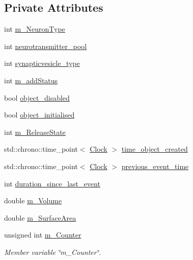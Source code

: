 \subsection*{Private Attributes}
\begin{DoxyCompactItemize}
\item 
int \mbox{\hyperlink{classSynapticVesicle_a2c71a4e09837c1b4ef2111e0eb634030}{m\+\_\+\+Neuron\+Type}}
\item 
int \mbox{\hyperlink{classSynapticVesicle_afa30c67ce14495976bc167cbd8528cdf}{neurotransmitter\+\_\+pool}}
\item 
int \mbox{\hyperlink{classSynapticVesicle_a568770c79ad49a55129076a1bc625db2}{synapticvesicle\+\_\+type}}
\item 
int \mbox{\hyperlink{classSynapticVesicle_a8a06e1643fa04b7f317523382786f200}{m\+\_\+add\+Status}}
\item 
bool \mbox{\hyperlink{classSynapticVesicle_ad50cf0b70327fd52cd6b2894e19e5842}{object\+\_\+disabled}}
\item 
bool \mbox{\hyperlink{classSynapticVesicle_aef65466f1440e00ad7d352095fe019de}{object\+\_\+initialised}}
\item 
int \mbox{\hyperlink{classSynapticVesicle_a73a7ecd250c4750d9b414c543e534a96}{m\+\_\+\+Release\+State}}
\item 
std\+::chrono\+::time\+\_\+point$<$ \mbox{\hyperlink{universe_8h_a0ef8d951d1ca5ab3cfaf7ab4c7a6fd80}{Clock}} $>$ \mbox{\hyperlink{classSynapticVesicle_af025ff605f37a683bd4a00d9140a217b}{time\+\_\+object\+\_\+created}}
\item 
std\+::chrono\+::time\+\_\+point$<$ \mbox{\hyperlink{universe_8h_a0ef8d951d1ca5ab3cfaf7ab4c7a6fd80}{Clock}} $>$ \mbox{\hyperlink{classSynapticVesicle_a9ba999fc5ee77df5a962592ea4935329}{previous\+\_\+event\+\_\+time}}
\item 
int \mbox{\hyperlink{classSynapticVesicle_add9c814d77d3059a436d5a8ed80b3636}{duration\+\_\+since\+\_\+last\+\_\+event}}
\item 
double \mbox{\hyperlink{classSynapticVesicle_a4cdf034bf90a4131ca05ea5e9ea5fc5e}{m\+\_\+\+Volume}}
\item 
double \mbox{\hyperlink{classSynapticVesicle_aed6d83381706ed28500d3aa9032fd6d0}{m\+\_\+\+Surface\+Area}}
\item 
unsigned int \mbox{\hyperlink{classSynapticVesicle_ad429db4636b70c355d39c212824c9bf4}{m\+\_\+\+Counter}}
\begin{DoxyCompactList}\small\item\em Member variable \char`\"{}m\+\_\+\+Counter\char`\"{}. \end{DoxyCompactList}\item 

\end{DoxyCompactItemize}
